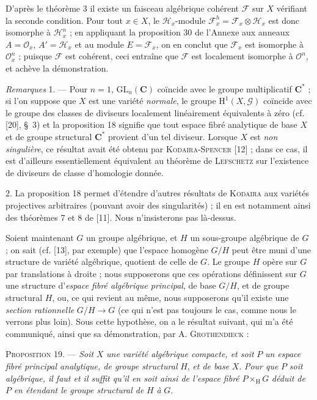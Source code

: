
D'après le théorème 3 il existe un faisceau algébrique cohérent $\mathcal{F}$ sur $X$ vérifiant la seconde condition. Pour tout $x \in X$, le $\mathcal{H}_x$-module $\mathcal{F}^h_x = \mathcal{F}_x \otimes \mathcal{H}_x$ est donc isomorphe à $\mathcal{H}^n_x$ ; en appliquant la proposition 30 de l'Annexe aux anneaux $A = \mathcal{O}_x$, $A' = \mathcal{H}_x$ et au module $E = \mathcal{F}_x$, on en conclut que $\mathcal{F}_x$ est isomorphe à $\mathcal{O}^n_x$ ; puisque $\mathcal{F}$ est cohérent, ceci entraîne que $\mathcal{F}$ est localement isomorphe à $\mathcal{O}^n$, et achève la démonstration.

\textit{Remarques} 1. --- Pour $n = 1$, $\mathrm{GL}_n(\mathbf{C})$ coïncide avec le groupe multiplicatif $\mathbf{C}^*$ ; si l'on suppose que $X$ est une variété \textit{normale}, le groupe $\mathrm{H}^1(X, \mathcal{G})$ coïncide avec le groupe des classes de diviseurs localement linéairement équivalents à zéro (cf. [20], \S\ 3) et la proposition 18 signifie que tout espace fibré analytique de base $X$ et de groupe structural $\mathbf{C}^*$ provient d'un tel diviseur. Lorsque $X$ est \textit{non singulière}, ce résultat avait été obtenu par \textsc{Kodaira-Spencer} [12] ; dans ce cas, il est d'ailleurs essentiellement équivalent au théorème de \textsc{Lefschetz} sur l'existence de diviseurs de classe d'homologie donnée.

2. La proposition 18 permet d'étendre d'autres résultats de \textsc{Kodaira} aux variétés projectives arbitraires (pouvant avoir des singularités) ; il en est notamment ainsi des théorèmes 7 et 8 de [11]. Nous n'insisterons pas là-dessus.

Soient maintenant $G$ un groupe algébrique, et $H$ un sous-groupe algébrique de $G$ ; on sait (cf. [13], par exemple) que l'espace homogène $G/H$ peut être muni d'une structure de variété algébrique, quotient de celle de $G$. Le groupe $H$ opère sur $G$ par translations à droite ; nous supposerons que ces opérations définissent sur $G$ une structure d'\textit{espace fibré algébrique principal}, de base $G/H$, et de groupe structural $H$, ou, ce qui revient au même, nous supposerons qu'il existe une \textit{section rationnelle} $G/H \to G$ (ce qui n'est pas toujours le cas, comme nous le verrons plus loin). Sous cette hypothèse, on a le résultat suivant, qui m'a été communiqué, ainsi que sa démonstration, par A. \textsc{Grothendieck} :

\textsc{Proposition} 19. --- \textit{Soit} $X$ \textit{une variété algébrique compacte, et soit} $P$ \textit{un espace fibré principal analytique, de groupe structural} $H$, \textit{et de base} $X$. \textit{Pour que} $P$ \textit{soit algébrique, il faut et il suffit qu'il en soit ainsi de l'espace fibré} $P \times_{\mathrm{H}} G$ \textit{déduit de} $P$ \textit{en étendant le groupe structural de} $H$ \textit{à} $G$.


